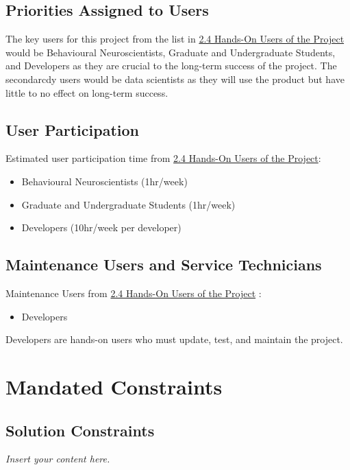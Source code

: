 \documentclass[12pt]{article}
\newcommand{\lips}{\textit{Insert your content here.}}
\begin{document}
\subsection{Priorities Assigned to Users}

\par{The key users for this project from the list in \hyperref[sec:2.4handson]{2.4 Hands-On Users of the Project} 
would be Behavioural Neuroscientists, Graduate and Undergraduate Students, and Developers as they are crucial 
to the long-term success of the project. The secondarcdy users would be data scientists as they will use the product 
but have little to no effect on long-term success.}

\subsection{User Participation}

\par{Estimated user participation time from \hyperref[sec:2.4handson]{2.4 Hands-On Users of the Project}:}
\begin{itemize}
    \item Behavioural Neuroscientists (1hr/week)
    \item Graduate and Undergraduate Students (1hr/week)
    \item Developers (10hr/week per developer)
\end{itemize}

\subsection{Maintenance Users and Service Technicians}

\par{Maintenance Users from \hyperref[sec:2.4handson]{2.4 Hands-On Users of the Project} :}
\begin{itemize}
    \item Developers
\end{itemize}

\par{Developers are hands-on users who must update, test, and maintain the project.}

\section{Mandated Constraints}
\subsection{Solution Constraints}
\lips
\end{document}
